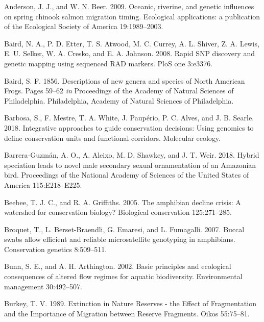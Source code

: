 \documentclass[twoside,12pt,final]{ucthesis-CA2012} %
\begin{document}
\begin{ucmainmatter}
\leavevmode\hypertarget{ref-anderson_oceanic_2009}{}%
Anderson, J. J., and W. N. Beer. 2009. Oceanic, riverine, and genetic
influences on spring chinook salmon migration timing. Ecological
applications: a publication of the Ecological Society of America
19:1989--2003.

\leavevmode\hypertarget{ref-baird_rapid_2008}{}%
Baird, N. A., P. D. Etter, T. S. Atwood, M. C. Currey, A. L. Shiver, Z.
A. Lewis, E. U. Selker, W. A. Cresko, and E. A. Johnson. 2008. Rapid SNP
discovery and genetic mapping using sequenced RAD markers. PloS one
3:e3376.

\leavevmode\hypertarget{ref-baird_descriptions_1856}{}%
Baird, S. F. 1856. Descriptions of new genera and species of North
American Frogs. Pages 59--62 \emph{in} Proceedings of the Academy of
Natural Sciences of Philadelphia. Philadelphia, Academy of Natural
Sciences of Philadelphia.

\leavevmode\hypertarget{ref-barbosa_integrative_2018}{}%
Barbosa, S., F. Mestre, T. A. White, J. Paupério, P. C. Alves, and J. B.
Searle. 2018. Integrative approaches to guide conservation decisions:
Using genomics to define conservation units and functional corridors.
Molecular ecology.

\leavevmode\hypertarget{ref-barrera-guzman_hybrid_2018}{}%
Barrera-Guzmán, A. O., A. Aleixo, M. D. Shawkey, and J. T. Weir. 2018.
Hybrid speciation leads to novel male secondary sexual ornamentation of
an Amazonian bird. Proceedings of the National Academy of Sciences of
the United States of America 115:E218--E225.

\leavevmode\hypertarget{ref-beebee_amphibian_2005}{}%
Beebee, T. J. C., and R. A. Griffiths. 2005. The amphibian decline
crisis: A watershed for conservation biology? Biological conservation
125:271--285.

\leavevmode\hypertarget{ref-broquet_buccal_2007}{}%
Broquet, T., L. Berset-Braendli, G. Emaresi, and L. Fumagalli. 2007.
Buccal swabs allow efficient and reliable microsatellite genotyping in
amphibians. Conservation genetics 8:509--511.

\leavevmode\hypertarget{ref-bunn_basic_2002}{}%
Bunn, S. E., and A. H. Arthington. 2002. Basic principles and ecological
consequences of altered flow regimes for aquatic biodiversity.
Environmental management 30:492--507.

\leavevmode\hypertarget{ref-burkey_extinction_1989}{}%
Burkey, T. V. 1989. Extinction in Nature Reserves - the Effect of
Fragmentation and the Importance of Migration between Reserve Fragments.
Oikos 55:75--81.


\end{ucmainmatter}
\end{document}
